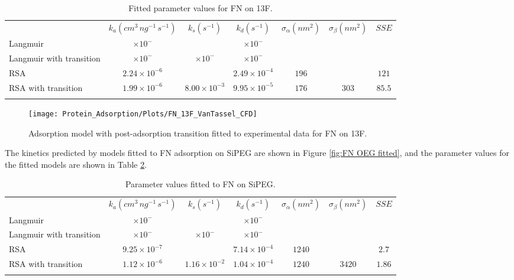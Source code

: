 \begin{table}
\caption{\label{tab:FN on 13F}Fitted parameter values for FN on 13F.}
\begin{tabular}{>{\raggedright}p{0.75in}cccccc}
 & $k_{a}\left(cm^{3}\, ng^{-1}\, s^{-1}\right)$ & $k_{s}\left(s^{-1}\right)$ & $k_{d}\left(s^{-1}\right)$ & $\sigma_{\alpha}\left(nm^{2}\right)$ & $\sigma_{\beta}\left(nm^{2}\right)$ & $SSE$\tabularnewline[\doublerulesep]
\cline{2-7} 
\noalign{\vskip\doublerulesep}
Langmuir & $\times10^{-}$ &  & $\times10^{-}$ & $ $ &  & $ $\tabularnewline
Langmuir with transition & $\times10^{-}$ & $\times10^{-}$ & $\times10^{-}$ & $ $ & $ $ & $ $\tabularnewline
\noalign{\vskip\doublerulesep}
RSA & $2.24\times10^{-6}$ &  & $2.49\times10^{-4}$ & $196$ &  & $121$\tabularnewline
\noalign{\vskip\doublerulesep}
RSA with transition & $1.99\times10^{-6}$ & $8.00\times10^{-3}$ & $9.95\times10^{-5}$ & $176$ & $303$ & $85.5$\tabularnewline
\noalign{\vskip\doublerulesep}
\end{tabular}%
\end{table}
%
\begin{figure}
\texttt{[image: Protein\_Adsorption/Plots/FN\_13F\_VanTassel\_CFD]}

\caption{\label{fig:FN 13F fitted}Adsorption model with post-adsorption transition
fitted to experimental data for FN on 13F.}
%
\end{figure}
 The kinetics predicted by models fitted to FN adsorption on SiPEG
are shown in Figure \ref{fig:FN OEG fitted}, and the parameter values
for the fitted models are shown in Table \ref{tab:FN OEG fitted params}.%
\begin{table}
\caption{\label{tab:FN OEG fitted params}Parameter values fitted to FN on
SiPEG.}
\begin{tabular}{>{\raggedright}p{0.75in}cccccc}
 & $k_{a}\left(cm^{3}\, ng^{-1}\, s^{-1}\right)$ & $k_{s}\left(s^{-1}\right)$ & $k_{d}\left(s^{-1}\right)$ & $\sigma_{\alpha}\left(nm^{2}\right)$ & $\sigma_{\beta}\left(nm^{2}\right)$ & $SSE$\tabularnewline[\doublerulesep]
\cline{2-7} 
\noalign{\vskip\doublerulesep}
Langmuir & $\times10^{-}$ &  & $\times10^{-}$ & $ $ &  & $ $\tabularnewline
Langmuir with transition & $\times10^{-}$ & $\times10^{-}$ & $\times10^{-}$ & $ $ & $ $ & $ $\tabularnewline
\noalign{\vskip\doublerulesep}
RSA & $9.25\times10^{-7}$ &  & $7.14\times10^{-4}$ & $1240$ &  & $2.7$\tabularnewline
\noalign{\vskip\doublerulesep}
RSA with transition & $1.12\times10^{-6}$ & $1.16\times10^{-2}$ & $1.04\times10^{-4}$ & $1240$ & $3420$ & $1.86$\tabularnewline
\noalign{\vskip\doublerulesep}
\end{tabular}%
\end{table}
